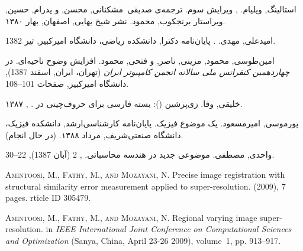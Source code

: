 \providecommand{\noopsort}[1]{}
\begin{thebibliography}{10}


\textsc{ استالینگ, ویلیام}.
,  ویرایش سوم.
\newblock ترجمه‌ی صدیقی‌~مشکنانی, محسن, و
  پدرام, حسین,  ویراستار برنجکوب, محمود.
\newblock نشر شیخ بهایی, اصفهان, بهار ۱۳۸۰.


\textsc{ امیدعلی, مهدی}.
.
\newblock  پایان‌نامه دکترا, دانشکده ریاضی،
  دانشگاه امیرکبیر, تیر 1382.


\textsc{ امین‌طوسی, محمود, مزینی, ناصر, و فتحی,
  محمود}.
\newblock افزایش وضوح ناحیه‌ای.
\newblock  در {\em چهاردهمین کنفرانس ملی سالانه
  انجمن کامپیوتر ایران\/} (تهران، ایران,
  اسفند 1387), دانشگاه امیرکبیر,  صفحات  101--108.


\textsc{ خلیقی, وفا}.
\newblock زی‌پرشین (\lr{\XePersian}): بسته فارسی برای
  حروف‌چینی در .
\newblock
  ,
  ۱۳۸۷.


\textsc{ پورموسی, امیرمسعود}.
\newblock یک موضوع فیزیک.
\newblock  پایان‌نامه کارشناسی‌ارشد, دانشکده
  فیزیک، دانشگاه صنعتی‌شریف, مرداد ۱۳۸۸.
\newblock (در حال انجام).


\textsc{ واحدی, مصطفی}.
\newblock موضوعی جدید در هندسه محاسباتی.
, 2 (آبان 1387), 22--30.

\begin{LTRbibitems}
\resetlatinfont
{}
\textsc{ Amintoosi, M., Fathy, M., and Mozayani, N.}
\newblock Precise image registration with structural similarity error
  measurement applied to super-resolution.
  (2009), 7 pages.
rticle ID 305479.

\end{LTRbibitems}

\begin{LTRbibitems}
\resetlatinfont
{}
\textsc{ Amintoosi, M., Fathy, M., and Mozayani, N.}
\newblock Regional varying image super-resolution.
\newblock  in {\em IEEE International Joint Conference on Computational
  Sciences and Optimization\/} (Sanya, China, April 23-26 2009), volume~1,  pp.
  913--917.

\end{LTRbibitems}


\end{thebibliography}
